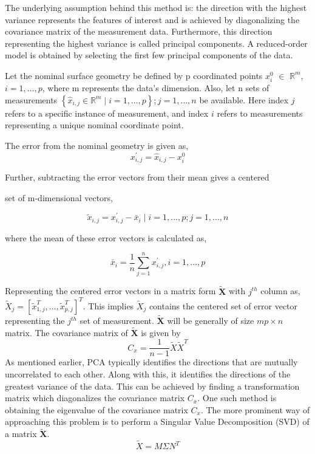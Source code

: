 The underlying assumption behind this method is: the direction with the highest variance represents the features of interest and is achieved by diagonalizing the covariance matrix of the measurement data. Furthermore, this direction representing the highest variance is called principal components. A reduced-order model is obtained by selecting the first few principal components of the data.

Let the nominal surface geometry be defined by p coordinated points $x_{i}^{0}$ $\in$ $\mathbb{R}^{m}$, $i=1, \ldots, p$,  where m represents the data's dimension. Also, let n sets of measurements 
$\left\{\hat{x}_{i, j} \in \mathbb{R}^{m} \mid i=1, \ldots, p\right\} ; j=1, \ldots, n$ be available. Here index $j$ refers to a specific instance of measurement, and index $i$ refers to measurements representing a unique nominal coordinate point.

The error from the nominal geometry is given as,
$$x_{i, j}^{\prime}=\hat{x}_{i, j}-x_{i}^{0}$$

Further, subtracting the error vectors from their mean gives a centered

set of m-dimensional vectors,

\begin{equation}\tilde{x}_{i, j}=x_{i, j}^{\prime}-\bar{x}_{i} \mid i=1, \ldots, p ; j=1, \ldots, n\end{equation}

where the mean of these error vectors is calculated as,

\begin{equation}
\bar{x}_{i}=\frac{1}{n} \sum_{j=1}^{n} x_{i, j}^{\prime}, i=1, \ldots, p
\end{equation}

Representing the centered error vectors in a matrix form $\tilde{\textbf{X}}$ with $j^{th}$ column as, $\tilde{X}_{j}=\left[\tilde{x}_{1, j}^{T}, \ldots, \tilde{x}_{p, j}^{T}\right]^{T}$. This implies $\tilde{X}_{j}$ contains the centered set of error vector representing the $j^{th}$ set of measurement. $\tilde{\textbf{X}}$ will be generally of size $mp \times n$ matrix. The covariance matrix of $\tilde{\textbf{X}}$ is given by 
\begin{equation}
C_{x}=\frac{1}{n-1} \tilde{X} \tilde{X}^{T}
\end{equation}
As mentioned earlier, PCA typically identifies the directions that are mutually uncorrelated to each other. Along with this, it identifies the directions of the greatest variance of the data. This can be achieved by finding a transformation matrix which diagonalizes the covariance matrix $C_x$. One such method is obtaining the eigenvalue of the covariance matrix $C_x$. The more prominent way of approaching this problem is to perform a Singular Value Decomposition (SVD) of a matrix $\tilde{\textbf{X}}$\cite{ghate}.
\begin{equation}
\tilde{X}=M \Sigma N^{T}
\end{equation}

